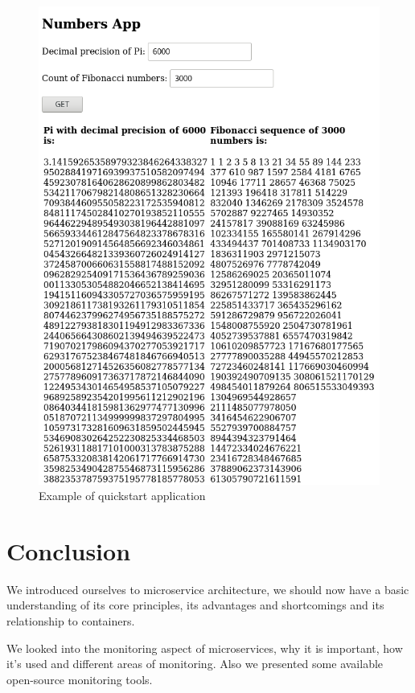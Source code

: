\documentclass[12pt,oneside]{fithesis2}
\begin{document}
\begin{figure}[ht!]
	\label{numbers}
	\centering
	\includegraphics[width=\textwidth]{images/numbers2.png}
	\caption{Example of quickstart application}
\end{figure}

\chapter{Conclusion}

We introduced ourselves to microservice architecture, we should now have a basic understanding of its core principles, its advantages and shortcomings and its relationship to containers.

We looked into the monitoring aspect of microservices, why it is important, how it's used and different areas of monitoring. Also we presented some available open-source monitoring tools.
\end{document}
